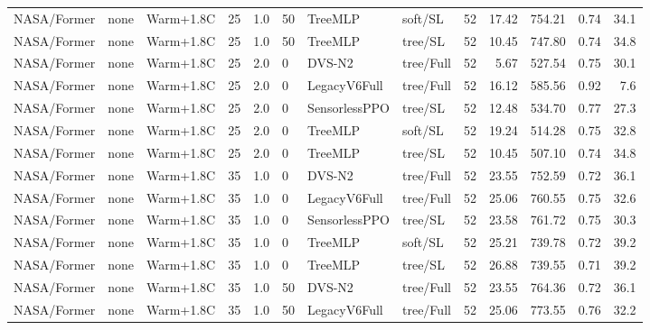 \documentclass[10pt,a4paper]{article}
\begin{document}
\begin{landscape}
\begin{longtable}{llllllllrrrrr}
NASA/Former & none & Warm+1.8C & 25 & 1.0 & 50 & TreeMLP & soft/SL & 52 & 17.42 & 754.21 & 0.74 & 34.1 \\

NASA/Former & none & Warm+1.8C & 25 & 1.0 & 50 & TreeMLP & tree/SL & 52 & 10.45 & 747.80 & 0.74 & 34.8 \\

NASA/Former & none & Warm+1.8C & 25 & 2.0 & 0 & DVS-N2 & tree/Full & 52 & 5.67 & 527.54 & 0.75 & 30.1 \\

NASA/Former & none & Warm+1.8C & 25 & 2.0 & 0 & LegacyV6Full & tree/Full & 52 & 16.12 & 585.56 & 0.92 & 7.6 \\

NASA/Former & none & Warm+1.8C & 25 & 2.0 & 0 & SensorlessPPO & tree/SL & 52 & 12.48 & 534.70 & 0.77 & 27.3 \\

NASA/Former & none & Warm+1.8C & 25 & 2.0 & 0 & TreeMLP & soft/SL & 52 & 19.24 & 514.28 & 0.75 & 32.8 \\

NASA/Former & none & Warm+1.8C & 25 & 2.0 & 0 & TreeMLP & tree/SL & 52 & 10.45 & 507.10 & 0.74 & 34.8 \\

NASA/Former & none & Warm+1.8C & 35 & 1.0 & 0 & DVS-N2 & tree/Full & 52 & 23.55 & 752.59 & 0.72 & 36.1 \\

NASA/Former & none & Warm+1.8C & 35 & 1.0 & 0 & LegacyV6Full & tree/Full & 52 & 25.06 & 760.55 & 0.75 & 32.6 \\

NASA/Former & none & Warm+1.8C & 35 & 1.0 & 0 & SensorlessPPO & tree/SL & 52 & 23.58 & 761.72 & 0.75 & 30.3 \\

NASA/Former & none & Warm+1.8C & 35 & 1.0 & 0 & TreeMLP & soft/SL & 52 & 25.21 & 739.78 & 0.72 & 39.2 \\

NASA/Former & none & Warm+1.8C & 35 & 1.0 & 0 & TreeMLP & tree/SL & 52 & 26.88 & 739.55 & 0.71 & 39.2 \\

NASA/Former & none & Warm+1.8C & 35 & 1.0 & 50 & DVS-N2 & tree/Full & 52 & 23.55 & 764.36 & 0.72 & 36.1 \\

NASA/Former & none & Warm+1.8C & 35 & 1.0 & 50 & LegacyV6Full & tree/Full & 52 & 25.06 & 773.55 & 0.76 & 32.2 \\


\end{longtable}
\end{landscape}
\end{document}
